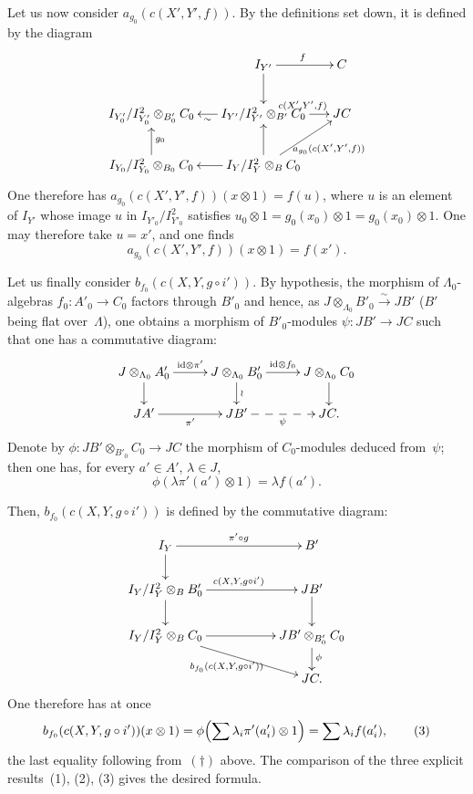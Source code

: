 Let us now consider \(a_{g_0}(c(X',Y',f))\). By the definitions set down,
it is defined by the diagram
\[
\xymatrix@C=1.5em@R=2.15em{
& I_{Y'} \ar[d] \ar[r]^{f} & C \\
I_{Y'_0}/I_{Y'_0}^2\otimes_{B'_0}C_0
& I_{Y'}/I_{Y'}^2\otimes_{B'}C_0
  \ar[l]^{\sim}
  \ar[r]^{c(X',Y',f)}
& JC \\
I_{Y_0}/I_{Y_0}^2\otimes_{B_0}C_0 \ar[u]_{g_0}
& I_Y/I_Y^2\otimes_B C_0
  \ar[l]
  \ar[u]
  \ar[ur]_{a_{g_0}(c(X',Y',f))}
&
}
\]
One therefore has
\(a_{g_0}(c(X',Y',f))(x\otimes 1)=f(u)\), where \(u\) is an element of
\(I_{Y'}\) whose image \(u\) in \(I_{Y'_0}/I_{Y'_0}^2\) satisfies
\(u_0\otimes 1=g_0(x_0)\otimes 1=g_0(x_0)\otimes 1\).
One may therefore take \(u=x'\), and one finds
\begin{equation}
a_{g_0}(c(X',Y',f))(x\otimes 1)=f(x').
\tag{2}
\end{equation}

Let us finally consider \(b_{f_0}(c(X,Y,g\circ i'))\). By hypothesis, the
morphism of \(\Lambda_0\)-algebras \(f_0\colon A'_0\to C_0\) factors through
\(B'_0\) and hence, as
\(J\otimes_{\Lambda_0}B'_0\xrightarrow{\sim}JB'\)
(\(B'\) being flat over~\(\Lambda\)), one obtains a morphism of
\(B'_0\)-modules \(\psi\colon JB'\to JC\) such that one has a commutative
diagram:
\[
\xymatrix@C=2.6em@R=1.8em{
J\otimes_{\Lambda_0}A'_0 \ar[r]^{\mathrm{id}\otimes\pi'} \ar[d]
& J\otimes_{\Lambda_0}B'_0 \ar[r]^{\mathrm{id}\otimes f_0} \ar[d]^{\wr}
& J\otimes_{\Lambda_0}C_0 \ar[d] \\
JA' \ar[r]_{\pi'}
& JB' \ar@{-->}[r]_{\psi}
& JC.
}
\]
Denote by \(\phi\colon JB'\otimes_{B'_0}C_0\to JC\) the morphism of
\(C_0\)-modules deduced from~\(\psi\); then one has, for every
\(a'\in A'\), \(\lambda\in J\),
\begin{equation}
\phi(\lambda\pi'(a')\otimes 1)=\lambda f(a').
\tag{\dag}
\end{equation}

Then, \(b_{f_0}(c(X,Y,g\circ i'))\) is defined by the commutative diagram:
\[
\xymatrix@C=2.4em@R=1.85em{
I_Y \ar[rr]^{\pi'\circ g} \ar[d]
& & B' \\
I_Y/I_Y^2\otimes_B B'_0
  \ar[rr]^{c(X,Y,g\circ i')} \ar[d]
& & JB' \ar[d] \\
I_Y/I_Y^2\otimes_B C_0
  \ar[rr] \ar[drr]_{b_{f_0}(c(X,Y,g\circ i'))}
& & JB'\otimes_{B'_0}C_0 \ar[d]^{\phi} \\
& & JC.
}
\]
One therefore has at once
\begin{equation}
b_{f_0}(c(X,Y,g\circ i'))(x\otimes 1)
=\phi\Bigl(\sum\lambda_i\pi'(a'_i)\otimes 1\Bigr)
=\sum\lambda_i f(a'_i),
\tag{3}
\end{equation}
the last equality following from~\((\dagger)\) above. The comparison of
the three explicit results~(1), (2), (3) gives the desired formula.

